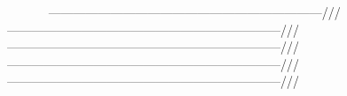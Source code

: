 ~\newline
~\newline
~\newline
~\newline
 ------------------------------------------------------------------/// ------------------------------------------------------------------/// ------------------------------------------------------------------/// ------------------------------------------------------------------/// ------------------------------------------------------------------/// ~\newline
~\newline
~\newline
~\newline
~\newline
~\newline
~\newline
~\newline
~\newline
~\newline
~\newline
~\newline
~\newline
~\newline
~\newline
~\newline
~\newline
~\newline
~\newline
~\newline
~\newline
~\newline
~\newline
~\newline
~\newline
~\newline
~\newline
~\newline
~\newline
~\newline
~\newline
~\newline
~\newline
~\newline
~\newline
~\newline
~\newline
~\newline
~\newline
~\newline
~\newline

